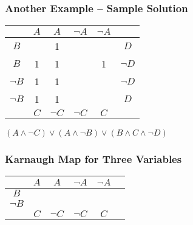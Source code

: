 \documentclass{beamer}
\theoremstyle{remark}
\begin{document}
\begin{frame}
	\frametitle{Another Example -- Sample Solution}
	\pause
	
	\begin{center}
	\begin{tabular}{c|c|c|c|c|c}
	 & $A$ & $A$ & $\lnot A$ & $\lnot A$ & \\ \hline
	$B$ & & 1 & & & $D$ \\ \hline
	$B$ & 1 & 1 & & 1 & $\lnot D$ \\ \hline
	$\lnot B$ & 1 & 1 & & & $\lnot D$ \\ \hline
	$\lnot B$ & 1 & 1 & & & $D$ \\ \hline
	 & $C$ & $\lnot C$ & $\lnot C$ & $C$ &
	\end{tabular}
	\end{center}
	
	\vspace{1.5em}
	
	$(A \land \lnot C) \lor (A \land \lnot B) \lor (B \land C \land \lnot D)$
\end{frame}

\begin{frame}
	\frametitle{Karnaugh Map for Three Variables}
	
	\begin{center}
	\begin{tabular}{c|c|c|c|c|c}
	 & $A$ & $A$ & $\lnot A$ & $\lnot A$ & \\ \hline
	 $B$ & &&&& \\ \hline
	 $\lnot B$ &&&&& \\ \hline
	  & $C$ & $\lnot C$ & $\lnot C$ & $C$ &
	
	\end{tabular}
	\end{center}
\end{frame}
\end{document}
